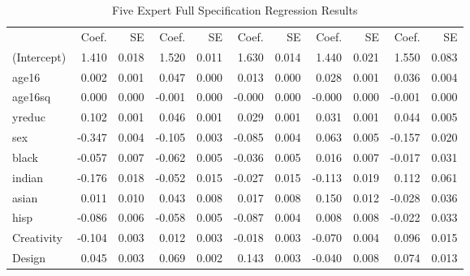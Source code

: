 \documentclass[12pt]{article}
\begin{document}
\begin{landscape}
\begin{table} \centering
  \caption{Five Expert Full Specification Regression Results}
    \begin{threeparttable}
      {\small
      \begin{tabular}[l]{l r r r r r r r r r r}
\cmidrule{1-11}
                &   Coef.  &   SE   &  Coef.  &  SE    &  Coef.     &  SE    &   Coef.  &   SE  &    Coef.   &  SE   \\
\cmidrule(l){2-3}  \cmidrule(l){4-5}  \cmidrule(l){6-7}   \cmidrule(l){8-9}  \cmidrule(l){10-11}
(Intercept)     &      1.410	&    0.018	  &     1.520	 &    0.011	   &     1.630	   &    0.014	   &      1.440  &     0.021	&       1.550   &    0.083   \\
age16           &      0.002	&    0.001	  &     0.047	 &    0.000	   &     0.013	   &    0.000	   &      0.028  &     0.001	&       0.036   &    0.004   \\
age16sq         &      0.000	&    0.000	  &    -0.001	 &    0.000	   &    -0.000	   &    0.000	   &     -0.000  &     0.000	&      -0.001   &    0.000   \\
yreduc          &      0.102	&    0.001	  &     0.046	 &    0.001	   &     0.029	   &    0.001	   &      0.031  &     0.001	&       0.044   &    0.005   \\
sex             &     -0.347	&    0.004	  &    -0.105	 &    0.003	   &    -0.085	   &    0.004	   &      0.063  &     0.005	&      -0.157   &    0.020   \\
black           &     -0.057	&    0.007	  &    -0.062	 &    0.005	   &    -0.036	   &    0.005	   &      0.016  &     0.007	&      -0.017   &    0.031   \\
indian          &     -0.176	&    0.018	  &    -0.052	 &    0.015	   &    -0.027	   &    0.015	   &     -0.113  &     0.019	&       0.112   &    0.061   \\
asian           &      0.011	&    0.010	  &     0.043	 &    0.008	   &     0.017	   &    0.008	   &      0.150  &     0.012	&      -0.028   &    0.036   \\
hisp            &     -0.086	&    0.006	  &    -0.058	 &    0.005	   &    -0.087	   &    0.004	   &      0.008  &     0.008	&      -0.022   &    0.033   \\
Creativity      &     -0.104	&    0.003	  &     0.012	 &    0.003	   &    -0.018	   &    0.003	   &     -0.070  &     0.004	&       0.096   &    0.015   \\
Design          &      0.045	&    0.003	  &     0.069	 &    0.002	   &     0.143	   &    0.003	   &     -0.040  &     0.008	&       0.074   &    0.013   \\

\end{tabular}}
\end{threeparttable}
\end{table}
\end{landscape}
\end{document}
